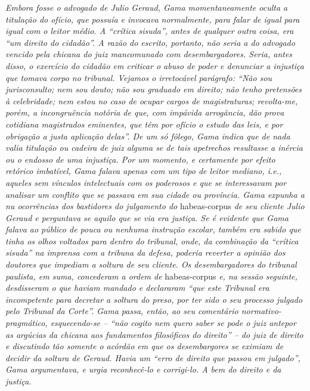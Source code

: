 \begin{didascalia}
\emph{Embora fosse o advogado de Julio Geraud, Gama momentaneamente
oculta a titulação do ofício, que possuía e invocava normalmente, para
falar de igual para igual com o leitor médio. A ``crítica sisuda'', antes
de qualquer outra coisa, era ``um direito do cidadão''. A razão do
escrito, portanto, não seria a do advogado vencido pela chicana do juiz
mancomunado com desembargadores. Seria, antes disso, o exercício do
cidadão em criticar o abuso de poder e denunciar a injustiça que tomava
corpo no tribunal. Vejamos o irretocável parágrafo: ``Não sou
jurisconsulto; nem sou douto; não sou graduado em direito; não tenho
pretensões à celebridade; nem estou no caso de ocupar cargos de
magistraturas; revolta-me, porém, a incongruência notória de que, com
impávida arrogância, dão prova cotidiana magistrados eminentes, que têm
por ofício o estudo das leis, e por obrigação a justa aplicação delas''.
De um só fôlego, Gama indica que de nada valia titulação ou cadeira de
juiz alguma se de tais apetrechos resultasse a inércia ou o endosso de
uma injustiça. Por um momento, e certamente por efeito retórico
imbatível, Gama falava apenas com um tipo de leitor mediano, i.e.,
aqueles sem vínculos intelectuais com os poderosos e que se interessavam
por analisar um conflito que se passava em sua cidade ou província. Gama
expunha a nu ocorrências dos bastidores do julgamento do} habeas-corpus
\emph{de seu cliente Julio Geraud e perguntava se aquilo que se via era
justiça. Se é evidente que Gama falava ao público de pouca ou nenhuma
instrução escolar, também era sabido que tinha os olhos voltados para
dentro do tribunal, onde, da combinação da ``crítica sisuda'' na imprensa
com a tribuna da defesa, poderia reverter a opinião dos doutores que
impediam a soltura de seu cliente. Os desembargadores do tribunal
paulista, em suma, concederam a ordem de} habeas-corpus \emph{e, na
sessão seguinte, desdisseram o que haviam mandado e declararam ``que este
Tribunal era incompetente para decretar a soltura do preso, por ter sido
o seu processo julgado pelo Tribunal da Corte''. Gama passa, então, ao
seu comentário normativo-pragmático, esquecendo-se -- ``não cogito nem
quero saber se pode o juiz antepor as argúcias da chicana aos
fundamentos filosóficos do direito'' -- do juiz de direito e discutindo
tão somente o acórdão em que os desembargores se eximiam de decidir da
soltura de Geraud. Havia um ``erro de direito que passou em julgado'',
Gama argumentava, e urgia reconhecê-lo e corrigi-lo. A bem do direito e
da justiça.}
\end{didascalia}

